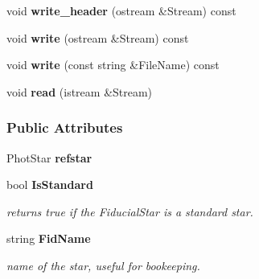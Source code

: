\begin{CompactItemize}
\item 
{}
void {\bf write\_\-header} (ostream \&Stream) const\label{class_lightcurve_a7}

\item 
{}
void {\bf write} (ostream \&Stream) const\label{class_lightcurve_a8}

\item 
{}
void {\bf write} (const string \&File\-Name) const\label{class_lightcurve_a9}

\item 
{}
void {\bf read} (istream \&Stream)\label{class_lightcurve_a10}

\end{CompactItemize}
\subsubsection*{Public Attributes}
\begin{CompactItemize}
\item 
{}
Phot\-Star {\bf refstar}\label{class_lightcurve_m0}

\item 
{}
bool {\bf Is\-Standard}\label{class_lightcurve_m1}

\begin{CompactList}\small\item\em returns true if the Fiducial\-Star is a standard star.\item\end{CompactList}\item 
{}
string {\bf Fid\-Name}\label{class_lightcurve_m2}

\begin{CompactList}\small\item\em name of the star, useful for bookeeping.\item\end{CompactList}\end{CompactItemize}
